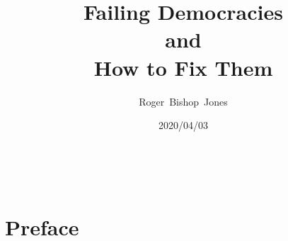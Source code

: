 \documentclass[10pt,titlepage]{book}
\title{\LARGE\bf Failing Democracies \\and \\How to Fix Them}
\author{Roger~Bishop~Jones}
\date{\small 2020/04/03}
\newcommand{\ignore}[1]{}
\begin{document}
\frontmatter

%
% 

\begin{titlepage}
\maketitle





\end{titlepage}

\ \

\ignore{
\begin{centering}
{}
\end{centering}
}%

\setcounter{tocdepth}{2}
{\parskip-0pt\tableofcontents}


\mainmatter

\pagebreak

\section*{Preface}
\end{document}
